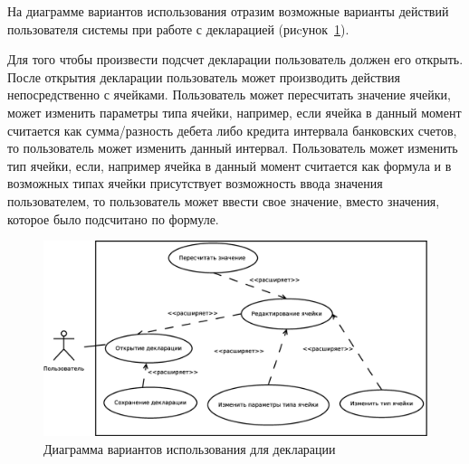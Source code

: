 \documentclass[14pt,a4paper]{reportmod}
\begin{document}
На диаграмме вариантов использования отразим возможные варианты действий пользователя системы при работе с декларацией (риcунок~\ref{pic:use_case_1}).


Для того чтобы произвести подсчет декларации пользователь должен его открыть. После открытия декларации пользователь может производить действия непосредственно с ячейками. Пользователь может пересчитать значение ячейки, может изменить параметры типа ячейки, например, если ячейка в данный момент считается как сумма/разность дебета либо кредита интервала банковских счетов, то пользователь может изменить данный интервал. Пользователь может изменить тип ячейки, если, например ячейка в данный момент считается как формула и в возможных типах ячейки присутствует возможность ввода значения пользователем, то пользователь может ввести свое значение, вместо значения, которое было подсчитано по формуле.
\begin{figure}
  \centering
  \includegraphics[scale=0.4]{uml/usecase_1}
  \caption{Диаграмма вариантов использования для декларации}
  \label{pic:use_case_1}
\end{figure}
\end{document}
